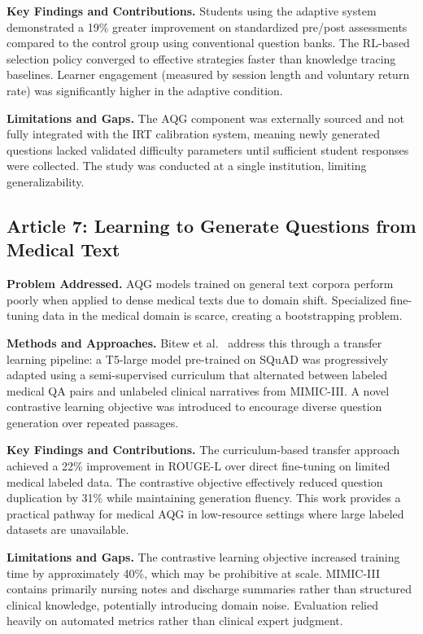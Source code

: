 \documentclass[conference]{IEEEtran}
\begin{document}
\textbf{Key Findings and Contributions.} Students using the adaptive system demonstrated a 19\% greater improvement on standardized pre/post assessments compared to the control group using conventional question banks. The RL-based selection policy converged to effective strategies faster than knowledge tracing baselines. Learner engagement (measured by session length and voluntary return rate) was significantly higher in the adaptive condition.

\textbf{Limitations and Gaps.} The AQG component was externally sourced and not fully integrated with the IRT calibration system, meaning newly generated questions lacked validated difficulty parameters until sufficient student responses were collected. The study was conducted at a single institution, limiting generalizability.

\subsection{Article 7: Learning to Generate Questions from Medical Text~\cite{bitew2022learning}}

\textbf{Problem Addressed.} AQG models trained on general text corpora perform poorly when applied to dense medical texts due to domain shift. Specialized fine-tuning data in the medical domain is scarce, creating a bootstrapping problem.

\textbf{Methods and Approaches.} Bitew et al.~\cite{bitew2022learning} address this through a transfer learning pipeline: a T5-large model pre-trained on SQuAD was progressively adapted using a semi-supervised curriculum that alternated between labeled medical QA pairs and unlabeled clinical narratives from MIMIC-III. A novel contrastive learning objective was introduced to encourage diverse question generation over repeated passages.

\textbf{Key Findings and Contributions.} The curriculum-based transfer approach achieved a 22\% improvement in ROUGE-L over direct fine-tuning on limited medical labeled data. The contrastive objective effectively reduced question duplication by 31\% while maintaining generation fluency. This work provides a practical pathway for medical AQG in low-resource settings where large labeled datasets are unavailable.

\textbf{Limitations and Gaps.} The contrastive learning objective increased training time by approximately 40\%, which may be prohibitive at scale. MIMIC-III contains primarily nursing notes and discharge summaries rather than structured clinical knowledge, potentially introducing domain noise. Evaluation relied heavily on automated metrics rather than clinical expert judgment.
\end{document}
